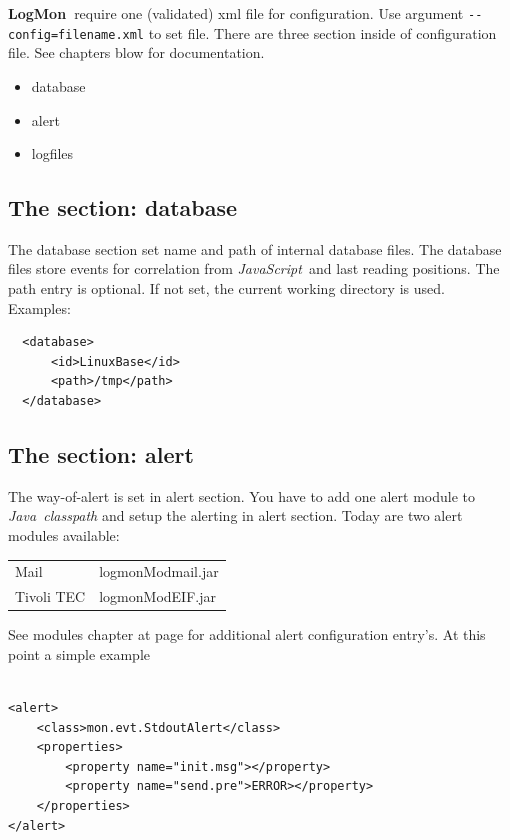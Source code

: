\documentclass[11pt,a4paper]{article}
\newcommand{\logmon}{\textbf{LogMon\ }}
\newcommand{\js}{\textit{JavaScript\ }}
\newcommand{\java}{\textit{Java\ }}
\begin{document}
\logmon require one (validated) xml file for configuration. Use argument
 \verb#--config=filename.xml# to set file.
There are three section inside of configuration file. See chapters blow for documentation.

\begin{itemize}
  \item database
  \item alert
  \item logfiles
\end{itemize}

\subsection{The section: database}
\label{sec:cfgdb}

The database section set name and path of internal database files. The database files store events for
correlation from \js and last reading positions. The path entry is optional. If not set, the current working
directory is used. Examples:

\begin{verbatim}
  <database>
      <id>LinuxBase</id>
      <path>/tmp</path>
  </database>
\end{verbatim}

\subsection{The section: alert}

The way-of-alert is set in alert section. You have to add one alert module to \java \textit{classpath} 
and setup the alerting in alert section. Today are two alert modules available:

\bigskip
\begin{tabular}{ll}
  Mail 	     & logmonModmail.jar\\[1ex]
  Tivoli TEC & logmonModEIF.jar\\
\end{tabular}
\bigskip

See modules chapter at page \pageref{sec:modules} for additional alert
configuration entry's. At this point a simple example

\begin{samepage}
\begin{verbatim}

<alert>
    <class>mon.evt.StdoutAlert</class>
    <properties>
        <property name="init.msg"></property>
        <property name="send.pre">ERROR></property>
    </properties>
</alert>

\end{verbatim}
\end{samepage}
\end{document}
